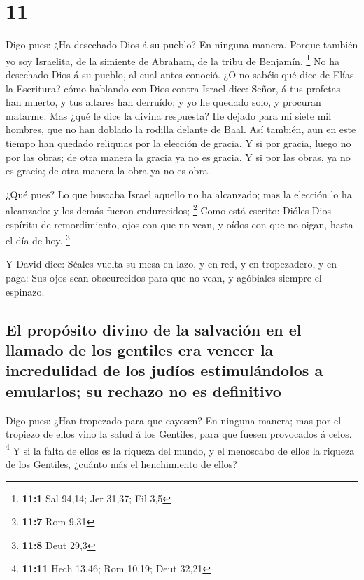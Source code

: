 \hypertarget{section-10}{%
\section{11}\label{section-10}}

 Digo pues: ¿Ha desechado Dios á su pueblo? En ninguna
manera. Porque también yo soy Israelita, de la simiente de Abraham, de
la tribu de Benjamín. \footnote{\textbf{11:1} Sal 94,14; Jer 31,37; Fil
  3,5}  No ha desechado Dios á su pueblo, al cual antes
conoció. ¿O no sabéis qué dice de Elías la Escritura? cómo hablando con
Dios contra Israel dice:  Señor, á tus profetas han muerto,
y tus altares han derruído; y yo he quedado solo, y procuran matarme.
 Mas ¿qué le dice la divina respuesta? He dejado para mí
siete mil hombres, que no han doblado la rodilla delante de Baal.
 Así también, aun en este tiempo han quedado reliquias por
la elección de gracia.  Y si por gracia, luego no por las
obras; de otra manera la gracia ya no es gracia. Y si por las obras, ya
no es gracia; de otra manera la obra ya no es obra.

 ¿Qué pues? Lo que buscaba Israel aquello no ha alcanzado;
mas la elección lo ha alcanzado: y los demás fueron endurecidos;
\footnote{\textbf{11:7} Rom 9,31}  Como está escrito: Dióles
Dios espíritu de remordimiento, ojos con que no vean, y oídos con que no
oigan, hasta el día de hoy. \footnote{\textbf{11:8} Deut 29,3}

 Y David dice: Séales vuelta su mesa en lazo, y en red, y en
tropezadero, y en paga:  Sus ojos sean obscurecidos para
que no vean, y agóbiales siempre el espinazo.

\hypertarget{el-propuxf3sito-divino-de-la-salvaciuxf3n-en-el-llamado-de-los-gentiles-era-vencer-la-incredulidad-de-los-juduxedos-estimuluxe1ndolos-a-emularlos-su-rechazo-no-es-definitivo}{%
\subsection{El propósito divino de la salvación en el llamado de los
gentiles era vencer la incredulidad de los judíos estimulándolos a
emularlos; su rechazo no es
definitivo}\label{el-propuxf3sito-divino-de-la-salvaciuxf3n-en-el-llamado-de-los-gentiles-era-vencer-la-incredulidad-de-los-juduxedos-estimuluxe1ndolos-a-emularlos-su-rechazo-no-es-definitivo}}

 Digo pues: ¿Han tropezado para que cayesen? En ninguna
manera; mas por el tropiezo de ellos vino la salud á los Gentiles, para
que fuesen provocados á celos. \footnote{\textbf{11:11} Hech 13,46; Rom
  10,19; Deut 32,21}  Y si la falta de ellos es la riqueza
del mundo, y el menoscabo de ellos la riqueza de los Gentiles, ¿cuánto
más el henchimiento de ellos?

